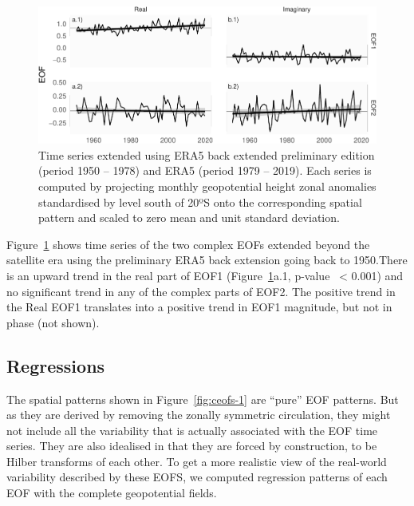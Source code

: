 \documentclass[smallextended]{svjour3}       %
\begin{document}
\begin{figure}
\includegraphics{../figures/extended-series-1} \caption{Time series extended using ERA5 back extended preliminary edition (period 1950 -- 1978) and ERA5 (period 1979 -- 2019). Each series is computed by projecting monthly geopotential height zonal anomalies standardised by level south of 20ºS onto the corresponding spatial pattern and scaled to zero mean and unit standard deviation.}\label{fig:extended-series}
\end{figure}

Figure~\ref{fig:extended-series} shows time series of the two complex EOFs extended beyond the satellite era using the preliminary ERA5 back extension going back to 1950.There is an upward trend in the real part of EOF1 (Figure~\ref{fig:extended-series}a.1, p-value~ \textless{} 0.001) and no significant trend in any of the complex parts of EOF2. The positive trend in the Real EOF1 translates into a positive trend in EOF1 magnitude, but not in phase (not shown).

\hypertarget{regressions}{%
\subsection{Regressions}\label{regressions}}

The spatial patterns shown in Figure~\ref{fig:ceofs-1} are ``pure'' EOF patterns. But as they are derived by removing the zonally symmetric circulation, they might not include all the variability that is actually associated with the EOF time series. They are also idealised in that they are forced by construction, to be Hilber transforms of each other. To get a more realistic view of the real-world variability described by these EOFS, we computed regression patterns of each EOF with the complete geopotential fields.
\end{document}
